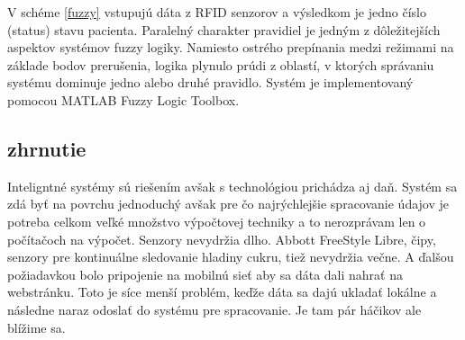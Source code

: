 V schéme \ref{fuzzy} vstupujú dáta z RFID senzorov a výsledkom je jedno číslo (status) stavu pacienta. Paralelný charakter pravidiel je jedným z dôležitejších aspektov systémov fuzzy logiky. Namiesto ostrého prepínania medzi režimami na základe bodov prerušenia, logika plynulo prúdi z oblastí, v ktorých správaniu systému dominuje jedno alebo druhé pravidlo. Systém je implementovaný pomocou MATLAB Fuzzy Logic Toolbox. \cite{2019}

\subsection{zhrnutie}
Inteligntné systémy sú riešením avšak s technológiou prichádza aj daň. Systém sa zdá byť na povrchu jednoduchý avšak pre čo najrýchlejšie spracovanie údajov je potreba celkom veľké množstvo výpočtovej techniky a to nerozprávam len o počítačoch na výpočet. Senzory nevydržia dlho. Abbott FreeStyle Libre, čipy, senzory pre kontinuálne sledovanie hladiny cukru, tiež nevydržia večne. A ďalšou požiadavkou bolo pripojenie na mobilnú sieť aby sa dáta dali nahrať na webstránku. Toto je síce menší problém, keďže dáta sa dajú ukladať lokálne a následne naraz odoslať do systému pre spracovanie. Je tam pár háčikov ale blížime sa.